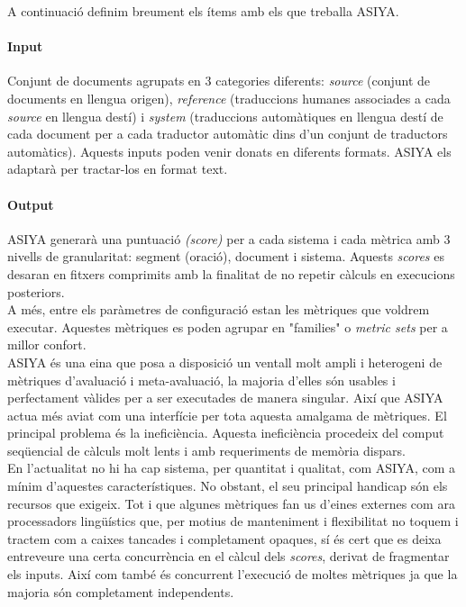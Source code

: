 \documentclass[11pt,a4paper]{article}
\begin{document}
A continuació definim breument els ítems amb els que treballa ASIYA. 

\paragraph{Input} Conjunt de documents agrupats en 3 categories diferents: \textit{source} (conjunt de documents en llengua origen), \textit{reference} (traduccions humanes associades a cada \textit{source} en llengua destí) i \textit{system} (traduccions automàtiques en llengua destí de cada document per a cada traductor automàtic dins d'un conjunt de traductors automàtics). Aquests inputs poden venir donats en diferents formats. ASIYA els adaptarà per tractar-los en format text.

\paragraph{Output} ASIYA generarà una puntuació \textit{(score)} per a cada sistema i cada mètrica amb 3 nivells de granularitat: segment (oració), document i sistema. Aquests \textit{scores} es desaran en fitxers comprimits amb la finalitat de no repetir càlculs en execucions posteriors.
\\

A més, entre els paràmetres de configuració estan les mètriques que voldrem executar. Aquestes mètriques es poden agrupar en "families" o \textit{metric sets} per a millor confort.
\\

ASIYA és una eina que posa a disposició un ventall molt ampli i heterogeni de mètriques d'avaluació i meta-avaluació, la majoria d'elles són usables i perfectament vàlides per a ser executades de manera singular. Així que ASIYA actua més aviat com una interfície per tota aquesta amalgama de mètriques. El principal problema és la ineficiència. Aquesta ineficiència procedeix del comput seqüencial de càlculs molt lents i amb requeriments de memòria dispars.
\\

En l'actualitat no hi ha cap sistema, per quantitat i qualitat, com ASIYA, com a mínim d'aquestes característiques. No obstant, el seu principal handicap són els recursos que exigeix. Tot i que algunes mètriques fan us d'eines externes com ara processadors lingüístics que, per motius de manteniment i flexibilitat no toquem i tractem com a caixes tancades i completament opaques, sí és cert que es deixa entreveure una certa concurrència en el càlcul dels \textit{scores}, derivat de fragmentar els inputs. Així com també és concurrent l'execució de moltes mètriques ja que la majoria són completament independents. 
\\
\end{document}
